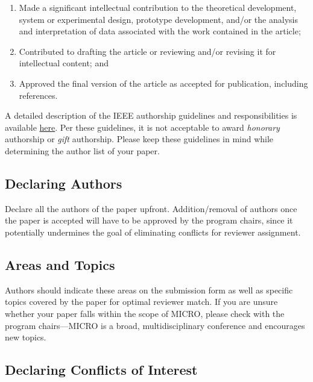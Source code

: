 \documentclass{sig-alternate}
\begin{document}
\begin{enumerate}

\item Made a significant intellectual contribution to the theoretical
  development, system or experimental design, prototype development,
  and/or the analysis and interpretation of data associated with the
  work contained in the article;

\item Contributed to drafting the article or reviewing and/or revising
  it for intellectual content; and

\item Approved the final version of the article as accepted for
  publication, including references.

\end{enumerate}

A detailed description of the IEEE authorship guidelines and
responsibilities is available
\href{https://www.ieee.org/publications_standards/publications/rights/Section821.html}{here}.
Per these guidelines, it is not acceptable to award {\em honorary }
authorship or {\em gift} authorship. Please keep these guidelines in
mind while determining the author list of your paper.


\subsection{Declaring Authors}

Declare all the authors of the paper upfront. Addition/removal of authors
once the paper is accepted will have to be approved by the program chairs,
since it potentially undermines the goal of eliminating conflicts for
reviewer assignment.


\subsection{Areas and Topics}

Authors should indicate these areas on the submission form as
well as specific topics covered by the paper for optimal reviewer match. If
you are unsure whether your paper falls within the scope of MICRO, please
check with the program chairs---MICRO is a broad, multidisciplinary
conference and encourages new topics.

\subsection{Declaring Conflicts of Interest}
\end{document}
